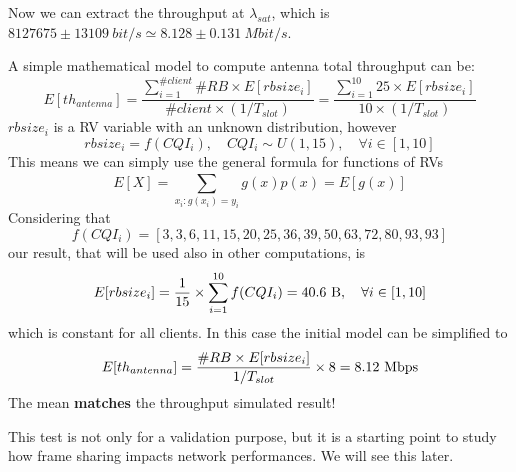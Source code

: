 Now we can extract the throughput at \(\lambda_{sat}\), which is \(8127675 \pm 13109\ bit/s \simeq 8.128 \pm 0.131\ Mbit/s\).

A simple mathematical model to compute antenna total throughput can be:
\begin{equation}
	E[th_{antenna}] = \frac{\sum\limits_{i=1}^{\#client} \#RB \times E[rbsize_i]}{\#client\times(1/T_{slot})} = \frac{\sum\limits_{i=1}^{10} 25 \times E[rbsize_i]}{10 \times (1/T_{slot})}
\end{equation}
\(rbsize_i\) is a RV variable with an unknown distribution, however
\begin{equation}
	 rbsize_i = f(CQI_i), \quad CQI_i\sim U(1,15), \quad \forall i \in [1,10]
\end{equation}
This means we can simply use the general formula for functions of RVs
\begin{equation}
	E[X] = \sum_{x_i : g(x_i)=y_i}^{} g(x)p(x) = E[g(x)]
\end{equation}
Considering that
\[f(CQI_i) = [3,3,6,11,15,20,25,36,39,50,63,72,80,93,93] \]
our result, that will be used also in other computations, is
\begin{equation}
	E[rbsize_i] = \frac{1}{15} \times \sum_{i=1}^{10} f(CQI_i) =40.6 \textnormal{ B}, \quad \forall i \in [1,10]
\end{equation}
which is constant for all clients. In this case the initial model can be simplified to
\begin{equation}
E[th_{antenna}] = \frac{\#RB \times E[rbsize_i]}{1/T_{slot}} \times 8 = 8.12 \textnormal{ Mbps}
\end{equation}
The mean \textbf{matches} the throughput simulated result!

This test is not only for a validation purpose, but it is a starting point to study how frame sharing impacts network performances. We will see this later.